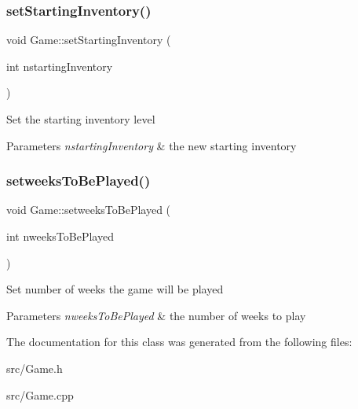 \subsubsection{\texorpdfstring{set\+Starting\+Inventory()}{setStartingInventory()}}
{\footnotesize\ttfamily void Game\+::set\+Starting\+Inventory (\begin{DoxyParamCaption}\item[{int}]{nstarting\+Inventory }\end{DoxyParamCaption})}

Set the starting inventory level 
\begin{DoxyParams}{Parameters}
{\em nstarting\+Inventory} & the new starting inventory \\
\hline
\end{DoxyParams}
\mbox{\label{classGame_a3979fb5baa71d71baf0070a4d3867cb1}} 
\subsubsection{\texorpdfstring{setweeks\+To\+Be\+Played()}{setweeksToBePlayed()}}
{\footnotesize\ttfamily void Game\+::setweeks\+To\+Be\+Played (\begin{DoxyParamCaption}\item[{int}]{nweeks\+To\+Be\+Played }\end{DoxyParamCaption})}

Set number of weeks the game will be played 
\begin{DoxyParams}{Parameters}
{\em nweeks\+To\+Be\+Played} & the number of weeks to play \\
\hline
\end{DoxyParams}


The documentation for this class was generated from the following files\+:\begin{DoxyCompactItemize}
\item 
src/Game.\+h\item 
src/Game.\+cpp\end{DoxyCompactItemize}
